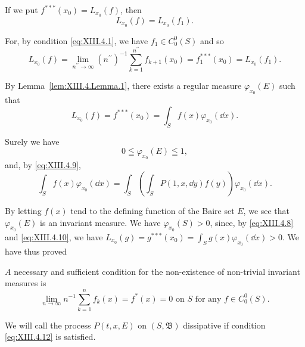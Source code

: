 If we put $f^{***}(x_0) = L_{x_0}(f)$, then 
\begin{equation}\label{eq:XIII.4.9}
L _ {x _{0}} (f) = L _ {x _{0}} \left(f _{1}\right).
\end{equation}

For, by condition \eqref{eq:XIII.4.1}, we have $f_{1} \in C_{0}^{0}(S)$ and so 
\[
L _ {x _{0}} (f) = \lim\limits _ {n ^{\prime \prime} \rightarrow \infty} (n ^{\prime \prime}) ^{-1} \sum\limits_{k=1} ^ {n ^{\prime \prime}} f _{k+1} (x _{0}) = f _{1} ^{***} (x _{0}) = L _ {x _{0}} (f _{1}).
\]

By Lemma~\ref{lem:XIII.4.Lemma.1}, there exists a regular measure $\varphi_{x_0}(E)$ such that 
\begin{equation}\label{eq:XIII.4.10}
L _ {x _{0}} (f) = f ^{***} \left(x _{0}\right) = \int_{S} f (x) \varphi_ {x _{0}} (\dd x).
\end{equation}

Surely we have 
\begin{equation}\label{eq:XIII.4.11}
0 \leqq \varphi_ {x _{0}} (E) \leqq 1,
\end{equation}
and, by \eqref{eq:XIII.4.9}, 
\[
\int_{S} f (x) \varphi_ {x _{0}} (\dd x) = \int_{S} \left(\int_{S} P (1, x, \dd y) f (y)\right) \varphi_ {x _{0}} (\dd x).
\]

By letting $f(x)$ tend to the defining function of the Baire set $E$, we see that $\varphi_{x_0}(E)$ is an invariant measure. We have $\varphi_{x_0}(S) > 0$, since, by \eqref{eq:XIII.4.8} and \eqref{eq:XIII.4.10}, we have $L_{x_0}(g) = g^{***}(x_0) = \int_S g(x) \varphi_{x_0}(\dd x) > 0$. We have thus proved 

\begin{theorem}\label{thm:XIII.4.Theorem.1} $A$ necessary and sufficient condition for the non-existence of non-trivial invariant measures is 
\begin{equation}\label{eq:XIII.4.12}
\lim\limits _{n \rightarrow \infty} n ^{-1} \sum\limits_{k=1} ^{n} f _{k} (x) = f ^{*} (x) = 0 \text{ on } S \text{ for any } f \in C _{0} ^{0} (S).
\end{equation}
\end{theorem}

\begin{definitionu} We will call the process $P(t, x, E)$ on $(S, \mathfrak{B})$ dissipative if condition \eqref{eq:XIII.4.12} is satisfied. 
\end{definitionu}

